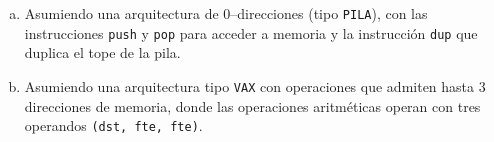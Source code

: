 \documentclass[12pt,a4paper]{article}
\begin{document}
\begin{enumerate}[a)]\itemsep0pt

\item Asumiendo una arquitectura de 0--direcciones (tipo \texttt{PILA}), con las instrucciones \texttt{push} y \texttt{pop} para acceder a memoria y la instrucción \texttt{dup} que duplica el tope de la pila.



\item Asumiendo una arquitectura tipo \texttt{VAX} con operaciones que admiten hasta 3 direcciones de memoria, donde las operaciones aritméticas operan con tres operandos \texttt{(dst, fte, fte)}.





\end{enumerate}

\newpage

\end{document}
